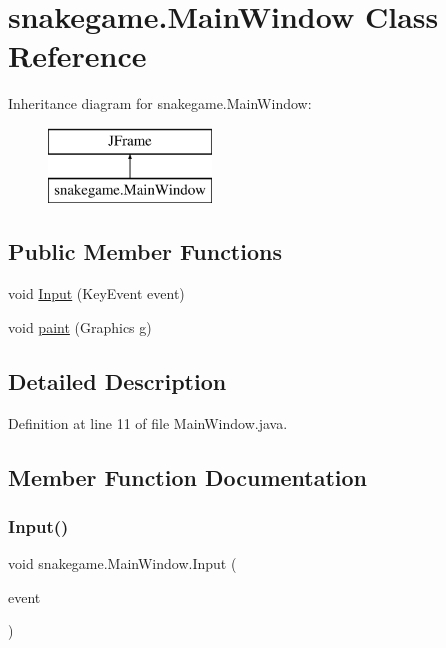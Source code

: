 \hypertarget{classsnakegame_1_1_main_window}{}\section{snakegame.\+Main\+Window Class Reference}
\label{classsnakegame_1_1_main_window}
Inheritance diagram for snakegame.\+Main\+Window\+:\begin{figure}[H]
\begin{center}
\leavevmode
\includegraphics[height=2.000000cm]{classsnakegame_1_1_main_window}
\end{center}
\end{figure}
\subsection*{Public Member Functions}
\begin{DoxyCompactItemize}
\item 
void \mbox{\hyperlink{classsnakegame_1_1_main_window_ae412ac0550a3d9a165dc7ce7e5481ba3}{Input}} (Key\+Event event)
\item 
void \mbox{\hyperlink{classsnakegame_1_1_main_window_afe9dbd469853597ae9a61c56b85d2762}{paint}} (Graphics g)
\end{DoxyCompactItemize}


\subsection{Detailed Description}


Definition at line 11 of file Main\+Window.\+java.



\subsection{Member Function Documentation}
\mbox{\label{classsnakegame_1_1_main_window_ae412ac0550a3d9a165dc7ce7e5481ba3}} 
\subsubsection{\texorpdfstring{Input()}{Input()}}
{\footnotesize\ttfamily void snakegame.\+Main\+Window.\+Input (\begin{DoxyParamCaption}\item[{Key\+Event}]{event }\end{DoxyParamCaption})}



